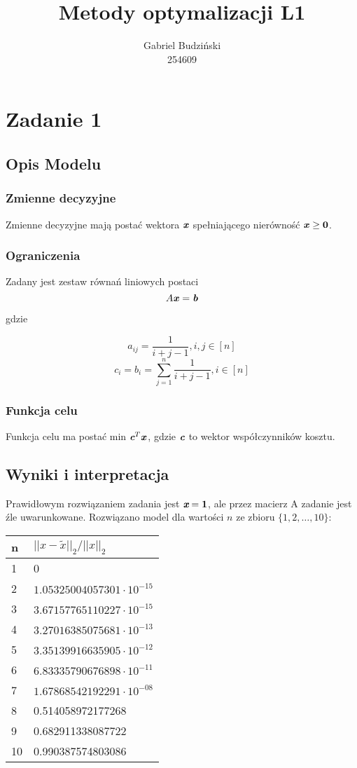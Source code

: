 \documentclass{article}
\title{Metody optymalizacji L1}
\author{Gabriel Budziński\\254609}
\begin{document}
\maketitle

\section{Zadanie 1}
\subsection{Opis Modelu}
\subsubsection{Zmienne decyzyjne}
Zmienne decyzyjne mają postać wektora $\textbf{\textit{x}}$ spełniającego nierówność $\textbf{\textit{x}} \geq \textbf{0}$.
\subsubsection{Ograniczenia}
Zadany jest zestaw równań liniowych postaci
\[A\textbf{\textit{x}}=\textbf{\textit{b}}\]

gdzie

\[a_{ij} = \frac{1}{i+j-1}, i,j \in [n]\]
\[c_i = b_i = \sum_{j=1}^n{\frac{1}{i+j-1}}, i \in [n]\]

\subsubsection{Funkcja celu}
Funkcja celu ma postać min ${\textit{{\textbf{c}}}}^T \textbf{\textit{x}}$, gdzie $\textbf{\textit{c}}$ to wektor współczynników kosztu.
\subsection{Wyniki i interpretacja}
Prawidłowym rozwiązaniem zadania jest $\textit{\textbf{x}}=\textbf{1}$, ale przez macierz A zadanie jest źle uwarunkowane.
Rozwiązano model dla wartości $n$ ze zbioru $\{1,2,\dots,10\}$:

\begin{table}[H]
\centering
\begin{tabular}{|l|l|}\hline
n & $||x-\tilde{x}||_2/||x||_2$\\\hline
1 & 0\\\hline
2 & $1.05325004057301\cdot 10^{-15}$\\\hline
3 & $3.67157765110227\cdot 10^{-15}$\\\hline
4 & $3.27016385075681\cdot 10^{-13}$\\\hline
5 & $3.35139916635905\cdot 10^{-12}$\\\hline
6 & $6.83335790676898\cdot 10^{-11}$\\\hline
7 & $1.67868542192291\cdot 10^{-08}$\\\hline
8 & 0.514058972177268\\\hline
9 & 0.682911338087722\\\hline
10 & 0.990387574803086\\\hline
\end{tabular}
\end{table}
\end{document}
